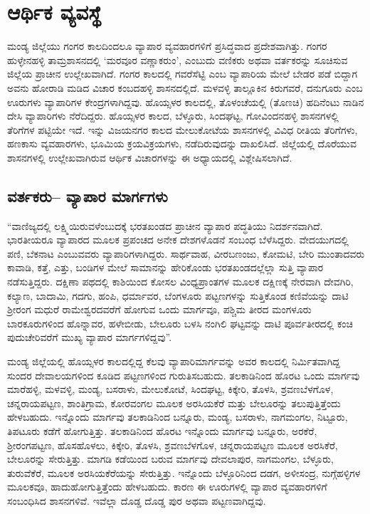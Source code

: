 
\chapter{ಆರ್ಥಿಕ ವ್ಯವಸ್ಥೆ}

ಮಂಡ್ಯ ಜಿಲ್ಲೆಯು ಗಂಗರ ಕಾಲದಿಂದಲೂ ವ್ಯಾಪಾರ ವ್ಯವಹಾರಗಳಿಗೆ ಪ್ರಸಿದ್ಧವಾದ ಪ್ರದೇಶವಾಗಿತ್ತು. ಗಂಗರ ಹುಳ್ಳೇನಹಳ್ಳಿ ತಾಮ್ರಶಾಸನದಲ್ಲಿ ‘ಮರವೂರ ವಣ್ಣಾಕರುಂ’, ಎಂಬುದು ವಣಿಕರು ಅಥವಾ ವರ್ತಕರನ್ನು ಸೂಚಿಸುವ ಜಿಲ್ಲೆಯ ಪ್ರಾಚೀನ ಉಲ್ಲೇಖವಾಗಿದೆ. ಗಂಗರ ಕಾಲದಲ್ಲಿ ಗವರೆಸೆಟ್ಟಿ ಎಂಬ ವ್ಯಾಪಾರಿಯ ಮೇಲೆ ಬೇಡರ ಪಡೆ ಬಿದ್ದಾಗ ಅವನು ಹೋರಾಡಿ ಮಡಿದ ವಿಚಾರ ಕಂಬದಹಳ್ಳಿ ಶಾಸನದಲ್ಲಿದೆ. ಮಳವಳ್ಳಿ ತಾಲ್ಲೂಕಿನ ಕಿರುಗವರೆ, ದನುಗೂರು ಎಂಬ ಊರುಗಳು ವ್ಯಾಪಾರಿಗಳ ಕೇಂದ್ರಗಳಾಗಿದ್ದವು. ಹೊಯ್ಸಳರ ಕಾಲದಲ್ಲಿ, ತೊಳಂಚೆಯಲ್ಲಿ (ತೊಣಚಿ) ಹದಿನೆಂಟು ನಾಡಿನ ದೇಸಿ ವ್ಯಾಪಾರಿಗಳು ನೆರೆದಿದ್ದರು. ಹೊಯ್ಸಳರ ಕಾಲದ, ಬೆಳ್ಳೂರು, ಸಿಂದಘಟ್ಟ, ಗೋವಿಂದನಹಳ್ಳಿ ಶಾಸನಗಳಲ್ಲಿ ತೆರಿಗೆಗಳ ಪಟ್ಟಿಯೇ ಇದೆ. ಇನ್ನು ವಿಜಯನಗರ ಕಾಲದ ಮೇಲುಕೋಟೆಯ ಶಾಸನಗಳಲ್ಲಿ ವಿವಿಧ ರೀತಿಯ ತೆರಿಗೆಗಳು, ಹಣಕಾಸು ವ್ಯವಹಾರಗಳು, ಭೂಮಿಯ ಕ್ರಯವಿಕ್ರಯಗಳು, ನಡೆದಿರುವುದನ್ನು ದಾಖಲಿಸಿದೆ. ಜಿಲ್ಲೆಯಲ್ಲಿ ದೊರೆಯುವ ಶಾಸನಗಳಲ್ಲಿ ಉಲ್ಲೇಖವಾಗಿರುವ ಆರ್ಥಿಕ ವಿಚಾರಗಳನ್ನು ಈ ಅಧ್ಯಾಯದಲ್ಲಿ ವಿಶ್ಲೇಷಿಸಲಾಗಿದೆ.

\section{ವರ್ತಕರು– ವ್ಯಾಪಾರ ಮಾರ್ಗಗಳು}

“ವಾಣಿಜ್ಯದಲ್ಲಿ ಲಕ್ಷ್ಮಿಯಿರುವಳೆಂಬುದಕ್ಕೆ ಭರತಖಂಡದ ಪ್ರಾಚೀನ ವ್ಯಾಪಾರ ಪದ್ಧತಿಯು ನಿದರ್ಶನವಾಗಿದೆ. ಭಾರತೀಯರೂ ವ್ಯಾಪಾರದ ಮೂಲಕ ಪ್ರಪಂಚದ ಅನೇಕ ದೇಶಗಳೊಡನೆ ಸಂಬಂಧ ಬೆಳೆಸಿದ್ದರು. ವೇದಯುಗದಲ್ಲಿ ಪಣಿ, ಬೆಕನಾಟ ಎಂಬುವವರು ವ್ಯಾಪಾರಿಗಳಾಗಿದ್ದರು. ಸಾರ್ಥವಾಹ, ವೀರಬಣಂಜು, ಕೋಮಟಿ, ಬೇರಿ ಮುಂತಾದವರು ಕಾವಾಡಿ, ಕತ್ತೆ, ಎತ್ತು, ಬಂಡಿಗಳ ಮೇಲೆ ಸಾಮಾನನ್ನು ಹೇರಿಕೊಂಡು ಭರತಖಂಡದಲ್ಲೆಲ್ಲಾ ಸುತ್ತಿ ವ್ಯಾಪಾರ ನಡೆಸುತ್ತಿದ್ದರು. ದಕ್ಷಿಣಾ ಪಥದಲ್ಲಿ ಕಾಶಿಯಿಂದ ಕೋಸಲ ವಿಂಧ್ಯಪ್ರಾಂತಗಳ ಮೂಲಕ ದಕ್ಷಿಣಕ್ಕೆ ನೇರವಾಗಿ ದೇವಗಿರಿ, ಕಲ್ಯಾಣ, ಬಾದಾಮಿ, ಗದಗು, ಹಂಪಿ, ಧರ್ಮಾವರ, ಬೆಂಗಳೂರು ಪಟ್ಟಣಗಳನ್ನು ಸುತ್ತಿಕೊಂಡ ಕಣಿವೆಯನ್ನು ದಾಟಿ ಶ‍್ರೀರಂಗ ಮಧುರೆ ರಾಮೇಶ್ವರದವರೆಗೆ ಹೋಗುವ ಒಂದು ಮಾರ್ಗವೂ, ಪಶ್ಚಿಮ ತೀರದ ಮಂಗಳೂರು ಬಾರಕೂರುಗಳಿಂದ ಹೊನ್ನಾವರ, ಹಳೇಬೀಡು, ಬೇಲೂರು ಬಳಸಿ ನಂಗಿಲಿ ಘಟ್ಟವನ್ನು ದಾಟಿ ಪೂರ್ವತೀರದಲ್ಲಿ ಕಂಚಿ ಪುದುಚೇರಿವರೆಗೆ ಮುಖ್ಯ ವ್ಯಾಪಾರ ಮಾರ್ಗಗಳಿದ್ದವು”.

ಮಂಡ್ಯ ಜಿಲ್ಲೆಯಲ್ಲಿ ಹೊಯ್ಸಳರ ಕಾಲದಲ್ಲಿದ್ದ ಕೆಲವು ವ್ಯಾಪಾರಿಮಾರ್ಗವನ್ನು ಅವರ ಕಾಲದಲ್ಲಿ ನಿರ್ಮಿತವಾಗಿದ್ದ ಸುಂದರ ದೇವಾಲಯಗಳಿಂದ ಕೂಡಿದ ಪಟ್ಟಣಗಳಿಂದ ಗುರುತಿಸಬಹುದು. ತಲಕಾಡಿನಿಂದ ಹೊರಟ ಒಂದು ಮಾರ್ಗವು ಮಾರೆಹಳ್ಳಿ, ಮಳವಳ್ಳಿ, ಮಂಡ್ಯ, ಬಸರಾಳು, ಮೇಲುಕೋಟೆ, ಸಿಂದಘಟ್ಟ, ಕಿಕ್ಕೇರಿ, ತೊಳಸಿ, ಶ್ರವಣಬೆಳಗೊಳ, ಚನ್ನರಾಯಪಟ್ಟಣ, ಶಾಂತಿಗ್ರಾಮ, ಕೋರವಂಗಲ ಮೂಲಕ ಅರಸಿಯಕೆರೆ ಮತ್ತು ಬೇಲೂರನ್ನು ತಲುಪುತ್ತಿತ್ತೆಂದು ಹೇಳಬಹುದು. ಇನ್ನೊಂದು ಮಾರ್ಗವು ತಲಕಾಡಿನಿಂದ ಬನ್ನೂರು, ಮಂಡ್ಯ, ಬಸರಾಳು, ನಾಗಮಂಗಲ, ನಿಟ್ಟೂರು, ತಿಪಟೂರು ಕಡೆಗೆ ಹೋಗುತ್ತಿತ್ತು. ತಲಕಾಡಿನಿಂದ ಹೊರಟ ಇನ್ನೊಂದು ಮಾರ್ಗವು ಬನ್ನೂರು, ಅರಕೆರೆ, ಶ‍್ರೀರಂಗಪಟ್ಟಣ, ಹೊಸಹೊಳಲು, ಕಿಕ್ಕೇರಿ, ತೊಳಸಿ, ಶ್ರವಣಬೆಳಗೊಳ, ಚನ್ನರಾಯಪಟ್ಟಣ ಮೂಲಕ ಅರಸಿಕೆರೆ, ಬೇಲೂರನ್ನು ಸೇರುತ್ತಿತ್ತು. ಮಾಗಡಿ ಕಡೆಯಿಂದ ಬರುವ ಮಾರ್ಗವು ದೇವಲಾಪುರ, ನಾಗಮಂಗಲ, ಬೆಳ್ಳೂರು, ತುರುವೆಕೆರೆ, ಮೂಲಕ ಅರಸಿಯಕೆರೆಯನ್ನು ಸೇರುತ್ತಿತ್ತು. ಇನ್ನೊಂದು ಬೆಳ್ಳೂರಿನಿಂದ ದಡಗ, ಅಳೀಸಂದ್ರ, ನುಗ್ಗೆಹಳ್ಳಿಗಳ ಮೂಲಕವೂ, ಹಾದುಹೋಗುತ್ತಿತ್ತೆಂದು ಹೇಳಬಹುದು. ಕಾರಣ ಈ ಊರುಗಳಲ್ಲಿ ವ್ಯಾಪಾರ ವ್ಯವಹಾರಗಳಿಗೆ ಸಂಬಂಧಿಸಿದ ಶಾಸನಗಳಿವೆ. ಇವೆಲ್ಲಾ ದೊಡ್ಡ ದೊಡ್ಡ ಪುರ ಅಥವಾ ಪಟ್ಟಣವಾಗಿದ್ದವು.

